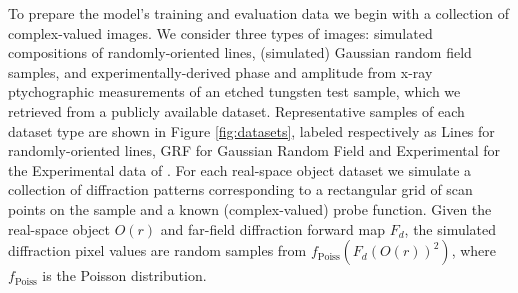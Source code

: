 \documentclass[sn-mathphys]{sn-jnl}%
\theoremstyle{thmstyleone}%
\theoremstyle{thmstyletwo}%
\theoremstyle{thmstylethree}%
\begin{document}
To prepare the model's training and evaluation data we begin with a collection of complex-valued images. We consider three types of images: simulated compositions of randomly-oriented lines, (simulated) Gaussian random field samples, and experimentally-derived phase and amplitude from x-ray ptychographic measurements of an etched tungsten test sample, which we retrieved from a publicly available dataset\cite{cherukara2020ai}. Representative samples of each dataset type are shown in Figure \ref{fig:datasets}, labeled respectively as Lines for randomly-oriented lines, GRF for Gaussian Random Field and Experimental for the Experimental data of \cite{cherukara2020ai}. For each real-space object dataset we simulate a collection of diffraction patterns corresponding to a rectangular grid of scan points on the sample and a known (complex-valued) probe function. Given the real-space object $O(r)$ and far-field diffraction forward map $F_d$, the simulated diffraction pixel values are random samples from $f_{\text{Poiss}}(F_d(O(r))^2)$, where $f_{\text{Poiss}}$ is the Poisson distribution.



%
\end{document}
